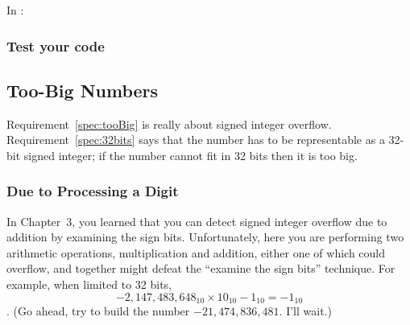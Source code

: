 In :
\begin{description}
\end{description}

\subsubsection*{Test your code}
\begin{description}
        \begin{description}
        \end{description}
\end{description}



\subsection{Too-Big Numbers}

Requirement~\ref{spec:tooBig} is really about signed integer overflow.
Requirement~\ref{spec:32bits} says that the number has to be representable as a 32-bit signed integer;
if the number cannot fit in 32 bits then it is too big.

\subsubsection{Due to Processing a Digit}

In Chapter~3, you learned that you can detect signed integer overflow due to addition by examining the sign bits.
Unfortunately, here you are performing two arithmetic operations, multiplication and addition, either one of which could overflow, and together might defeat the ``examine the sign bits'' technique.
For example, when limited to 32 bits, \[-2,147,483,648_{10} \times 10_{10} - 1_{10} = -1_{10}\].
(Go ahead, try to build the number $-21,474,836,481$. I'll wait.)

